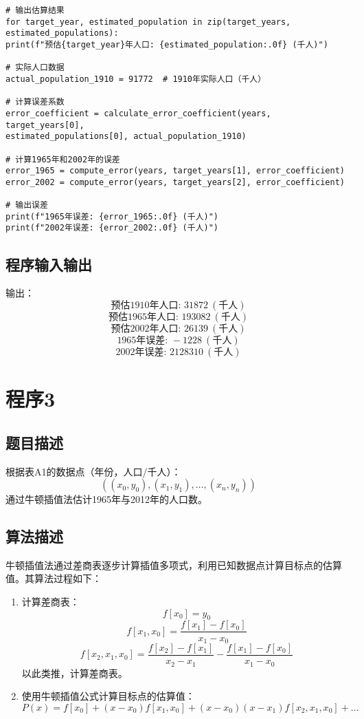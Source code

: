 \documentclass[b5paper;twoside]{article}
\begin{document}
\begin{lstlisting}
# 输出估算结果
for target_year, estimated_population in zip(target_years, 
estimated_populations):
print(f"预估{target_year}年人口: {estimated_population:.0f} (千人)")

# 实际人口数据
actual_population_1910 = 91772  # 1910年实际人口（千人）

# 计算误差系数
error_coefficient = calculate_error_coefficient(years, target_years[0], 
estimated_populations[0], actual_population_1910)

# 计算1965年和2002年的误差
error_1965 = compute_error(years, target_years[1], error_coefficient)
error_2002 = compute_error(years, target_years[2], error_coefficient)

# 输出误差
print(f"1965年误差: {error_1965:.0f} (千人)")
print(f"2002年误差: {error_2002:.0f} (千人)")

\end{lstlisting}

\subsection{程序输入输出}

输出：
\[
\text{预估1910年人口: } 31872 \ (\text{千人})
\]
\[
\text{预估1965年人口: } 193082 \ (\text{千人})
\]
\[
\text{预估2002年人口: } 26139 \ (\text{千人})
\]
\[
\text{1965年误差: } -1228 \ (\text{千人})
\]
\[
\text{2002年误差: } 2128310 \ (\text{千人})
\]


\section{程序3}

\subsection{题目描述}

根据表A1的数据点（年份，人口/千人）： 
\[
((x_0, y_0),(x_1, y_1), \dots, (x_n, y_n))
\]
通过牛顿插值法估计1965年与2012年的人口数。

\subsection{算法描述}

牛顿插值法通过差商表逐步计算插值多项式，利用已知数据点计算目标点的估算值。其算法过程如下：

\begin{enumerate}
	\item 计算差商表：
	\[
	f[x_0] = y_0
	\]
	\[
	f[x_1, x_0] = \frac{f[x_1] - f[x_0]}{x_1 - x_0}
	\]
	\[
	f[x_2, x_1, x_0] = \frac{f[x_2] - f[x_1]}{x_2 - x_1} - \frac{f[x_1] - 
	f[x_0]}{x_1 - x_0}
	\]
	以此类推，计算差商表。
	
	\item 使用牛顿插值公式计算目标点的估算值：
	\[
	P(x) = f[x_0] + (x - x_0)f[x_1, x_0] + (x - x_0)(x - x_1)f[x_2, x_1, x_0] + 
	\dots
	\]
\end{enumerate}
\end{document}
